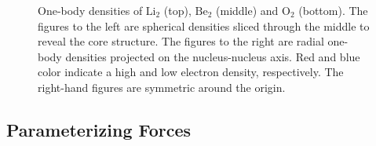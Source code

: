 \begin{figure}[h]
\begin{center}
  \caption{One-body densities of $\mathrm{Li_2}$ (top), $\mathrm{Be_2}$ (middle) and $\mathrm{O_2}$ (bottom). The figures to the left are spherical densities sliced through the middle to reveal the core structure. The figures to the right are radial one-body densities projected on the nucleus-nucleus axis. Red and blue color indicate a high and low electron density, respectively. The right-hand figures are symmetric around the origin.}
  \label{fig:OBD_Molecules}
 \end{center}
\end{figure}
\renewcommand\floatpagefraction{.7}

\clearpage
\subsection{Parameterizing Forces}

